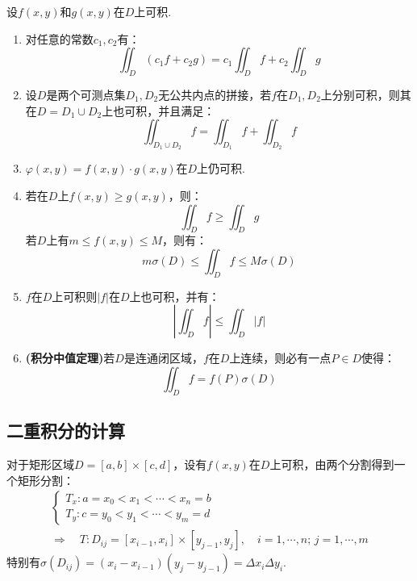 \begin{theorem}
    设$f(x,y)$和$g(x,y)$在$D$上可积.
    \begin{enumerate}[circ]
        \item 对任意的常数$c_1,c_2$有：
        \[\iint_D (c_1 f + c_2 g) = c_1 \iint_D f + c_2 \iint_D g\]
        \item 设$D$是两个可测点集$D_1,D_2$无公共内点的拼接，若$f$在$D_1,D_2$上分别可积，则其在$D = D_1 \cup D_2$上也可积，并且满足：
        \[\iint_{D_1 \cup D_2} f = \iint_{D_1} f + \iint_{D_2} f\]
        \item $\varphi(x,y) = f(x,y)\cdot g(x,y)$在$D$上仍可积.
        \item 若在$D$上$f(x,y) \geqslant g(x,y)$，则：
        \[\iint_D f \geqslant \iint_D g\]
        若$D$上有$m \leqslant f(x,y) \leqslant M$，则有：
        \[m\sigma(D) \leqslant \iint_D f \leqslant M\sigma(D)\]
        \item $f$在$D$上可积则$|f|$在$D$上也可积，并有：
        \[\left|\iint_D f\right| \leqslant \iint_D |f|\]
        \item \textbf{(积分中值定理)}若$D$是连通闭区域，$f$在$D$上连续，则必有一点$P \in D$使得：
        \[\iint_D f = f(P)\sigma(D)\]
    \end{enumerate}
\end{theorem}


\subsection{二重积分的计算}
对于矩形区域$D = [a,b]\times[c,d]$，设有$f(x,y)$在$D$上可积，由两个分割得到一个矩形分割：
\begin{gather*}
    \begin{cases}
        T_x: a = x_0 < x_1 < \cdots < x_n = b \\
        T_y: c = y_0 < y_1 < \cdots < y_m = d
    \end{cases}\\
    \Rightarrow\quad T:D_{ij} = [x_{i-1},x_i]\times[y_{j-1},y_j],\quad i = 1,\cdots,n;\,j = 1,\cdots,m
\end{gather*}
特别有$\sigma(D_{ij})=(x_i-x_{i-1})(y_j-y_{j-1}) = \Delta x_i \Delta y_i$.

